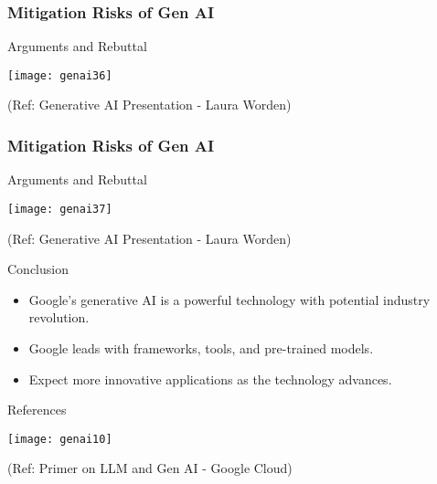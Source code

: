 \begin{frame}[fragile]\frametitle{Mitigation Risks of Gen AI}

Arguments and Rebuttal

\begin{center}
\texttt{[image: genai36]}
\end{center}


{\tiny (Ref: Generative AI Presentation  - Laura Worden)}

\end{frame}

\begin{frame}[fragile]\frametitle{Mitigation Risks of Gen AI}

Arguments and Rebuttal

\begin{center}
\texttt{[image: genai37]}
\end{center}


{\tiny (Ref: Generative AI Presentation  - Laura Worden)}

\end{frame}



\begin{frame}[fragile]{Conclusion}
\begin{itemize}
\item Google's generative AI is a powerful technology with potential industry revolution.
\item Google leads with frameworks, tools, and pre-trained models.
\item Expect more innovative applications as the technology advances.
\end{itemize}
\end{frame}

\begin{frame}[fragile]{References}

\begin{center}
\texttt{[image: genai10]}
\end{center}

{\tiny (Ref: Primer on LLM and Gen AI - Google Cloud)}
  
\end{frame}